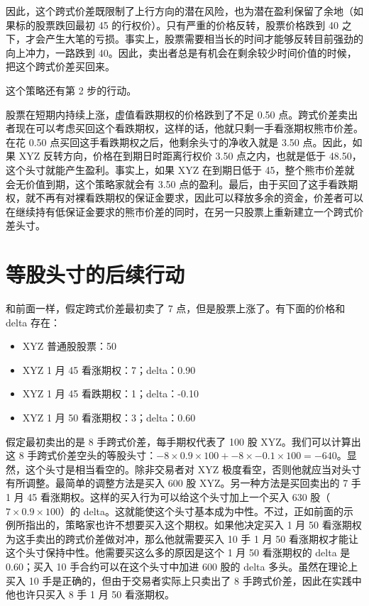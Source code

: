 因此，这个跨式价差既限制了上行方向的潜在风险，也为潜在盈利保留了余地（如果标的股票跌回最初 45 的行权价）。只有严重的价格反转，股票价格跌到 40 之下，才会产生大笔的亏损。事实上，股票需要相当长的时间才能够反转目前强劲的向上冲力，一路跌到 40。因此，卖出者总是有机会在剩余较少时间价值的时候，把这个跨式价差买回来。

这个策略还有第 2 步的行动。
\begin{tcolorbox}
    股票在短期内持续上涨，虚值看跌期权的价格跌到了不足 0.50 点。跨式价差卖出者现在可以考虑买回这个看跌期权，这样的话，他就只剩一手看涨期权熊市价差。在花 0.50 点买回这手看跌期权之后，他剩余头寸的净收入就是 3.50 点。因此，如果 XYZ 反转方向，价格在到期日时距离行权价 3.50 点之内，也就是低于 48.50，这个头寸就能产生盈利。事实上，如果 XYZ 在到期日低于 45，整个熊市价差就会无价值到期，这个策略家就会有 3.50 点的盈利。最后，由于买回了这手看跌期权，就不再有对裸看跌期权的保证金要求，因此可以释放多余的资金，价差者可以在继续持有低保证金要求的熊市价差的同时，在另一只股票上重新建立一个跨式价差头寸。
\end{tcolorbox}
\section{等股头寸的后续行动}
\begin{tcolorbox}
    和前面一样，假定跨式价差最初卖了 7 点，但是股票上涨了。有下面的价格和 delta 存在：
    \begin{itemize}
        \item XYZ 普通股股票：50
        \item XYZ 1 月 45 看涨期权：7；delta：0.90
        \item XYZ 1 月 45 看跌期权：1；delta：-0.10
        \item XYZ 1 月 50 看涨期权：3；delta：0.60
    \end{itemize}
\end{tcolorbox}

假定最初卖出的是 8 手跨式价差，每手期权代表了 100 股 XYZ。我们可以计算出这 8 手跨式价差空头的等股头寸：$-8\times 0.9 \times 100 + -8 \times -0.1\times 100=-640$。显然，这个头寸是相当看空的。除非交易者对 XYZ 极度看空，否则他就应当对头寸有所调整。最简单的调整方法是买入 600 股 XYZ。另一种方法是买回卖出的 7 手 1 月 45 看涨期权。这样的买入行为可以给这个头寸加上一个买入 630 股（$7\times 0.9\times 100$）的 delta。这就能使这个头寸基本成为中性。不过，正如前面的示例所指出的，策略家也许不想要买入这个期权。如果他决定买入 1 月 50 看涨期权为这手卖出的跨式价差做对冲，那么他就需要买入 10 手 1 月 50 看涨期权才能让这个头寸保持中性。他需要买这么多的原因是这个 1 月 50 看涨期权的 delta 是 0.60；买入 10 手合约可以在这个头寸中加进 600 股的 delta 多头。虽然在理论上买入 10 手是正确的，但由于交易者实际上只卖出了 8 手跨式价差，因此在实践中他也许只买入 8 手 1 月 50 看涨期权。
